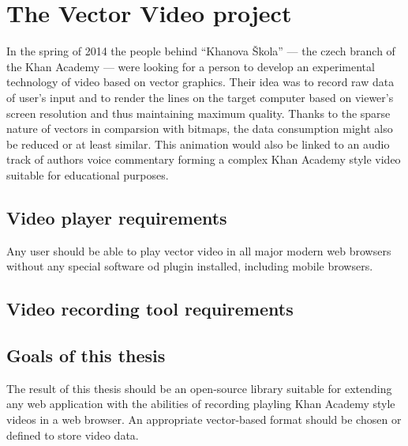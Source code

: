 \chapter{The Vector Video project}

In the spring of 2014 the people behind ``Khanova Škola'' --- the czech branch of the Khan Academy --- were looking for a person to develop an experimental technology of video based on vector graphics. Their idea was to record raw data of user's input and to render the lines on the target computer based on viewer's screen resolution and thus maintaining maximum quality. Thanks to the sparse nature of vectors in comparsion with bitmaps, the data consumption might also be reduced or at least similar. This animation would also be linked to an audio track of authors voice commentary forming a complex Khan Academy style video suitable for educational purposes.



\section{Video player requirements}
Any user should be able to play vector video in all major modern web browsers without any special software od plugin installed, including mobile browsers.

\section{Video recording tool requirements}




\section{Goals of this thesis}

The result of this thesis should be an open-source library suitable for extending any web application with the abilities of recording playling Khan Academy style videos in a web browser. An appropriate vector-based format should be chosen or defined to store video data.